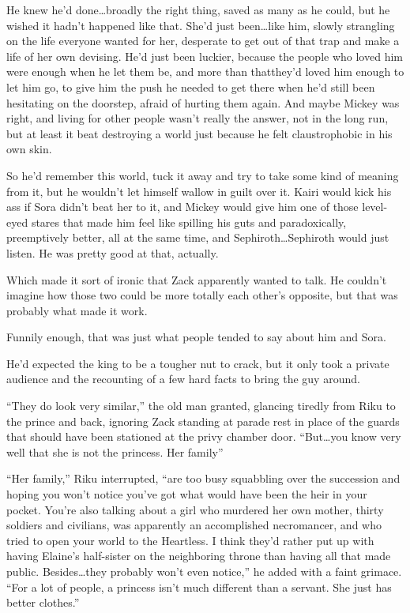 He knew he'd done\ldots broadly the right thing, saved as many as he could, but he wished it hadn't happened like that. She'd just been\ldots like him, slowly strangling on the life everyone wanted for her, desperate to get out of that trap and make a life of her own devising. He'd just been luckier, because the people who loved him were enough when he let them be, and more than that\textemdash they'd loved him enough to let him go, to give him the push he needed to get there when he'd still been hesitating on the doorstep, afraid of hurting them again. And maybe Mickey was right, and living for other people wasn't really the answer, not in the long run, but at least it beat destroying a world just because he felt claustrophobic in his own skin.

So he'd remember this world, tuck it away and try to take some kind of meaning from it, but he wouldn't let himself wallow in guilt over it. Kairi would kick his ass if Sora didn't beat her to it, and Mickey would give him one of those level-eyed stares that made him feel like spilling his guts and paradoxically, preemptively better, all at the same time, and Sephiroth\ldots Sephiroth would just listen. He was pretty good at that, actually.

Which made it sort of ironic that Zack apparently wanted to talk. He couldn't imagine how those two could be more totally each other's opposite, but that was probably what made it work.

Funnily enough, that was just what people tended to say about him and Sora.

He'd expected the king to be a tougher nut to crack, but it only took a private audience and the recounting of a few hard facts to bring the guy around.

``They do look very similar,'' the old man granted, glancing tiredly from Riku to the prince and back, ignoring Zack standing at parade rest in place of the guards that should have been stationed at the privy chamber door. ``But\ldots you know very well that she is not the princess. Her family\textemdash ''

``Her family,'' Riku interrupted, ``are too busy squabbling over the succession and hoping you won't notice you've got what would have been the heir in your pocket. You're also talking about a girl who murdered her own mother, thirty soldiers and civilians, was apparently an accomplished necromancer, and who tried to open your world to the Heartless. I think they'd rather put up with having Elaine's half-sister on the neighboring throne than having all that made public. Besides\ldots they probably won't even notice,'' he added with a faint grimace. ``For a lot of people, a princess isn't much different than a servant. She just has better clothes.''

